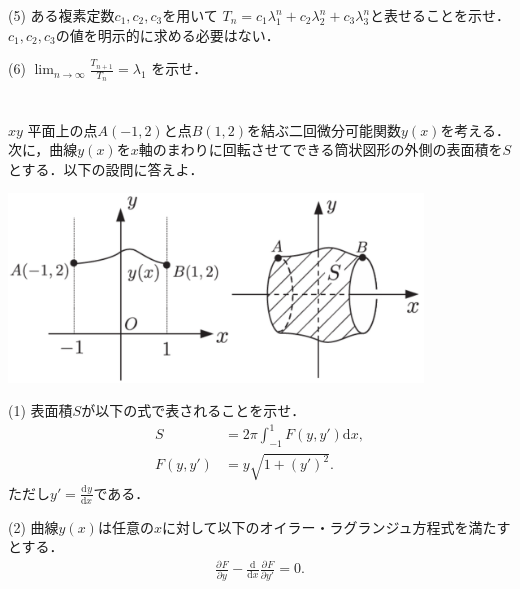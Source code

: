\documentclass[a4j]{jarticle}
\let \ds \displaystyle
\newcommand{\diff}[3]{
  \frac{\mathrm{d}^{#1} #2}{\mathrm{d} #3^{#1}}
}
\newcommand{\pdiff}[3]{
  \frac{\partial^{#1} #2}{\partial #3^{#1}}
}
\begin{document}
\begin{screen}
 (5) ある複素定数$c_1,c_2,c_3$を用いて $T_n = c_1\lambda_1^n+c_2\lambda_2^n+c_3\lambda_3^n$と表せることを示せ．$c_1,c_2,c_3$の値を明示的に求める必要はない．
\end{screen}

\begin{screen}
 (6) $\ds \lim_{n \rightarrow \infty} \frac{T_{n+1}}{T_n} = \lambda_1$ を示せ．
\end{screen}
\section{}

\begin{screen}
 $xy$ 平面上の点$A(-1,2)$と点$B(1,2)$を結ぶ二回微分可能関数$y(x)$を考える．次に，曲線$y(x)$を$x$軸のまわりに回転させてできる筒状図形の外側の表面積を$S$とする．以下の設問に答えよ．
 
 \centering\includegraphics[width=11cm]{figure_2016_01.png}
\end{screen}

\begin{screen}
 (1) 表面積$S$が以下の式で表されることを示せ．
 \begin{align*}
  S &= 2 \pi \int_{-1}^1 F(y,y') \mathrm{d}x,\tag{2.1} \\
  F(y,y') &=y \sqrt{ 1 + \left(y'\right)^2}. \tag{2.2}
 \end{align*}
 ただし$\ds y' = \diff{}{y}{x}$である．
\end{screen}

\begin{screen}
 (2) 曲線$y(x)$は任意の$x$に対して以下のオイラー・ラグランジュ方程式を満たすとする．
 \begin{align*}
  \pdiff{}{F}{y} - \diff{}{}{x}\pdiff{}{F}{y'} = 0. \tag{2.3}
 \end{align*}
\end{screen}

\section{}
\end{document}
